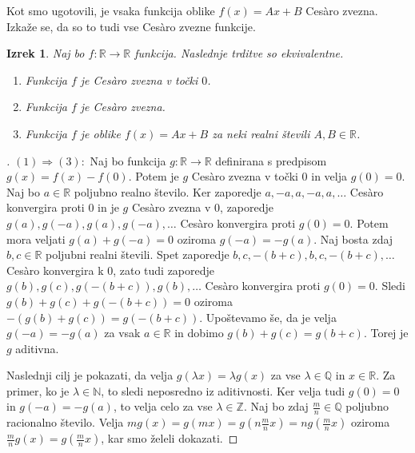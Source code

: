 \documentclass[a4paper,12pt]{article}
\theoremstyle{definition}
\theoremstyle{plain}
\newtheorem{izrek}{Izrek}
\newenvironment{dokaz}{\begin{proof}[\bfseries\upshape\proofname]}{\end{proof}}
\begin{document}
Kot smo ugotovili, je vsaka funkcija oblike $f(x) = Ax + B$ Ces\`{a}ro zvezna. Izkaže se, da so to tudi vse Ces\`{a}ro zvezne funkcije.

\begin{izrek}
    Naj bo $f: \mathbb{R} \rightarrow \mathbb{R}$ funkcija. Naslednje trditve so ekvivalentne.
    \begin{enumerate}
        \item Funkcija $f$ je Ces\`{a}ro zvezna v točki $0$.
        \item Funkcija $f$ je Ces\`{a}ro zvezna.
        \item Funkcija $f$ je oblike $f(x) = Ax + B$ za neki realni števili $A, B \in \mathbb{R}$.
    \end{enumerate}
\end{izrek}
\begin{dokaz}
    $(1) \Rightarrow (3): $ Naj bo funkcija $g: \mathbb{R} \rightarrow \mathbb{R}$ definirana s predpisom $g(x) = f(x) - f(0)$. Potem je $g$ Ces\`{a}ro zvezna v točki $0$ in velja $g(0) = 0$. 
    Naj bo $a \in \mathbb{R}$ poljubno realno število. Ker zaporedje $a, -a, a, -a, a, \ldots$ Ces\`{a}ro konvergira proti $0$ in je $g$ Ces\`{a}ro zvezna v $0$, zaporedje $g(a), g(-a), g(a), g(-a), \ldots$ Ces\`{a}ro konvergira proti $g(0) = 0$. Potem mora veljati $g(a) + g(-a) = 0$ oziroma $g(-a) = -g(a)$. 
    Naj bosta zdaj $b, c \in \mathbb{R}$ poljubni realni števili. Spet zaporedje $b, c, -(b+c), b, c, -(b+c), \ldots$ Ces\`{a}ro konvergira k $0$, zato tudi zaporedje $g(b), g(c), g(-(b+c)), g(b), \ldots$ Ces\`{a}ro konvergira proti $g(0) = 0$. Sledi $g(b) + g(c) + g(-(b+c)) = 0$ oziroma $-(g(b) + g(c)) = g(-(b+c))$. Upoštevamo še, da je velja $g(-a) = -g(a)$ za vsak $a \in \mathbb{R}$ in dobimo $g(b) + g(c) = g(b+c)$. Torej je $g$ aditivna.

    Naslednji cilj je pokazati, da velja $g(\lambda x) = \lambda g(x)$ za vse $\lambda \in \mathbb{Q}$ in $x \in \mathbb{R}$. Za primer, ko je $\lambda \in \mathbb{N}$, to sledi neposredno iz aditivnosti. Ker velja tudi $g(0) = 0$ in $g(-a) = -g(a)$, to velja celo za vse $\lambda \in \mathbb{Z}$. Naj bo zdaj $\frac{m}{n} \in \mathbb{Q}$ poljubno racionalno število. Velja $mg(x) = g(mx) = g(n\frac{m}{n}x) = ng(\frac{m}{n}x)$ oziroma $\frac{m}{n}g(x) = g(\frac{m}{n}x)$, kar smo želeli dokazati.


\end{dokaz}
\end{document}
